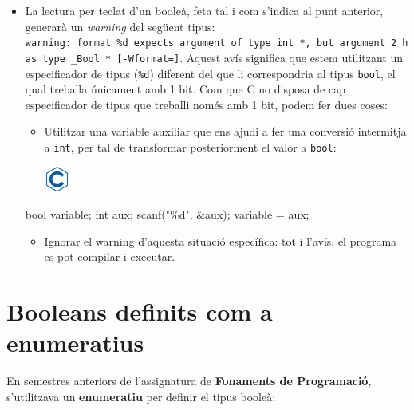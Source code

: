 \documentclass[]{book}
\newenvironment{Shaded}{\begin{snugshade}}{\end{snugshade}}
\newcommand{\DataTypeTok}[1]{\textcolor[rgb]{0.13,0.29,0.53}{#1}}
\newcommand{\NormalTok}[1]{#1}
\newcommand{\StringTok}[1]{\textcolor[rgb]{0.31,0.60,0.02}{#1}}
\providecommand{\tightlist}{%
  \setlength{\itemsep}{0pt}\setlength{\parskip}{0pt}}
\begin{document}
\begin{itemize}
\tightlist
\item
  La lectura per teclat d'un booleà, feta tal i com s'indica al punt anterior, generarà un \emph{warning} del següent tipus: \texttt{warning:\ format\ \textquotesingle{}\%d\textquotesingle{}\ expects\ argument\ of\ type\ \textquotesingle{}int\ *\textquotesingle{},\ but\ argument\ 2\ has\ type\ \textquotesingle{}\_Bool\ *\textquotesingle{}\ {[}-Wformat={]}}. Aquest avís significa que estem utilitzant un especificador de tipus (\texttt{\%d}) diferent del que li correspondria al tipus \texttt{bool}, el qual treballa únicament amb 1 bit. Com que C no disposa de cap especificador de tipus que treballi només amb 1 bit, podem fer dues coses:

  \begin{itemize}
  \tightlist
  \item
    Utilitzar una variable auxiliar que ens ajudi a fer una conversió intermitja a \texttt{int}, per tal de transformar posteriorment el valor a \texttt{bool}:

    \includegraphics{./img/c.png}
  \end{itemize}

\begin{Shaded}
\begin{Highlighting}[]
\DataTypeTok{bool}\NormalTok{ variable;}
\DataTypeTok{int}\NormalTok{ aux;}
\NormalTok{scanf(}\StringTok{"\%d"}\NormalTok{, \&aux);}
\NormalTok{variable = aux;}
\end{Highlighting}
\end{Shaded}

  \begin{itemize}
  \tightlist
  \item
    Ignorar el warning d'aquesta situació específica: tot i l'avís, el programa es pot compilar i executar.
  \end{itemize}
\end{itemize}

\hypertarget{booleans-definits-com-a-enumeratius}{%
\section{Booleans definits com a enumeratius}\label{booleans-definits-com-a-enumeratius}}

En semestres anteriors de l'assignatura de \textbf{Fonaments de Programació}, s'utilitzava un \textbf{enumeratiu} per definir el tipus booleà:
\end{document}
